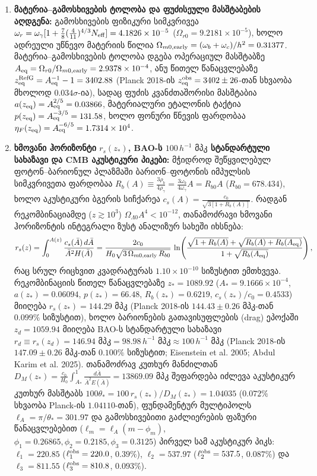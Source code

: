 \documentclass[11pt,a4paper]{article}
\begin{document}
\begin{enumerate}[label=\arabic*.]
\item \textbf{მატერია–გამოსხივების ტოლობა და ფუძისეული მასშტაბების აღდგენა:} გამოსხივების ფიზიკური სიმკვრივეა $\omega_r = \omega_\gamma[1 + \frac{7}{8}(\frac{4}{11})^{4/3}N_{\rm eff}] = 4.1826\times 10^{-5}$ ($\Omega_{r0} = 9.2181\times 10^{-5}$), ხოლო ადრეული უწნევო მატერიის წილია $\Omega_{m0,\rm early} = (\omega_b + \omega_c)/h^2 = 0.31377$. მატერია–გამოსხივების ტოლობა დგება ოპერაციულ მასშტაბზე $A_{\rm eq} = \Omega_{r0}/\Omega_{m0,\rm early} = 2.9378\times 10^{-4}$, ანუ წითელ წანაცვლებაზე $z_{\rm eq}^{\rm RefG} = A_{\rm eq}^{-1} - 1 = 3402.88$ (Planck 2018-ის $z_{\rm eq}^{\rm obs} = 3402 \pm 26$-თან სხვაობა მხოლოდ $0.034\sigma$-ია), სადაც ფუძის კვანძთაშორისი მასშტაბია $a(z_{\rm eq}) = A_{\rm eq}^{2/5} = 0.03866$, მატერიალური ეტალონის ტაქტია $p(z_{\rm eq}) = A_{\rm eq}^{-3/5} = 131.58$, ხოლო ფონური წნევის ფარდობაა $\eta_F(z_{\rm eq}) = A_{\rm eq}^{-6/5} = 1.7314\times 10^4$.
\item \textbf{ხმოვანი ჰორიზონტი $r_s(z_*)$, BAO-ს $100\,h^{-1}\text{ მპკ}$ სტანდარტული სახაზავი და CMB აკუსტიკური პიკები:} მჭიდროდ შეწყვილებულ ფოტონ–ბარიონულ პლაზმაში ბარიონ–ფოტონის იმპულსის სიმკვრივეთა ფარდობაა $R_b(A) \equiv \frac{3\rho_b}{4\rho_\gamma} = \frac{3\omega_b}{4\omega_\gamma}A = R_{b0}A$ ($R_{b0} = 678.434$), ხოლო აკუსტიკური ბგერის სიჩქარეა $c_s(A) = \frac{c_0}{\sqrt{3[1 + R_b(A)]}}$. რადგან რეკომბინაციამდე ($z \gtrsim 10^3$) $\Omega_{\Lambda 0}A^4 < 10^{-12}$, თანამოძრავი ხმოვანი ჰორიზონტის ინტეგრალი ზუსტ ანალიზურ სახეში იხსნება:
\[
   r_s(z) = \int_0^{A(z)} \frac{c_s(\bar{A})\,d\bar{A}}{\bar{A}^2 H(\bar{A})}
   = \frac{2 c_0}{H_0\sqrt{3\,\Omega_{m0,\rm early}\,R_{b0}}}\,
   \ln\!\left(\frac{\sqrt{1 + R_b(A)} + \sqrt{R_b(A) + R_b(A_{\rm eq})}}{1 + \sqrt{R_b(A_{\rm eq})}}\right),
\]
რაც სრულ რიცხვით კვადრატურას $1.10\times 10^{-10}$ სიზუსტით ემთხვევა. რეკომბინაციის წითელ წანაცვლებაზე $z_* = 1089.92$ ($A_* = 9.1666\times 10^{-4}$, $a(z_*) = 0.06094$, $p(z_*) = 66.48$, $R_b(z_*) = 0.6219$, $c_s(z_*)/c_0 = 0.4533$) მიიღება \textbf{$r_s(z_*) = 144.29\text{ მპკ}$} (Planck 2018-ის $144.43 \pm 0.26\text{ მპკ}$-თან $0.099\%$ სიზუსტით), ხოლო ბარიონების გათავისუფლების (drag) ეპოქაში $z_d = 1059.94$ მიიღება BAO-ს სტანდარტული სახაზავი \textbf{$r_d \equiv r_s(z_d) = 146.94\text{ მპკ} = 98.98\,h^{-1}\text{ მპკ} \approx 100\,h^{-1}\text{ მპკ}$} (Planck 2018-ის $147.09 \pm 0.26\text{ მპკ}$-თან $0.100\%$ სიზუსტით; Eisenstein et al. 2005; Abdul Karim et al. 2025). თანამოძრავ კუთხურ მანძილთან $D_M(z_*) = \frac{c_0}{H_0}\int_{A_*}^1 \frac{d\bar{A}}{\bar{A}^2 E(\bar{A})} = 13869.09\text{ მპკ}$ შეფარდება იძლევა აკუსტიკურ კუთხურ მასშტაბს $100\theta_* = 100\,r_s(z_*)/D_M(z_*) = 1.04035$ ($0.072\%$ სხვაობა Planck-ის $1.04110$-თან), ფუნდამენტურ მულტიპოლს $\ell_A = \pi/\theta_* = 301.97$ და გამოსხივებითი გაძლიერების ფაზური წანაცვლებებით ($\ell_m = \ell_A(m - \phi_m)$, $\phi_1 = 0.26865, \phi_2 = 0.2185, \phi_3 = 0.3125$) პირველ სამ აკუსტიკურ პიკს: \textbf{$\ell_1 = 220.85$} ($\ell_1^{\rm obs} = 220.0$, $0.39\%$), \textbf{$\ell_2 = 537.97$} ($\ell_2^{\rm obs} = 537.5$, $0.087\%$) და \textbf{$\ell_3 = 811.55$} ($\ell_3^{\rm obs} = 810.8$, $0.093\%$).

\end{enumerate}
\end{document}

